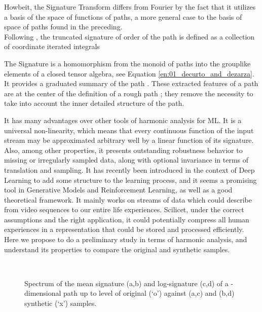\documentclass[lettersize,journal]{IEEEtran}
\begin{document}
Howbeit, the Signature Transform differs from Fourier by the fact that it utilizes a basis of the space of functions of paths, a more general case to the basis of space of paths found in the preceding. 
\\

Following \cite{Bonnier2019}, the truncated signature of order  of the path  is defined as a collection of coordinate iterated integrals


The Signature is a homomorphism from the monoid of paths into the grouplike elements of a closed tensor algebra, see Equation \ref{en:01_decurto_and_dezarza}. It provides a graduated summary of the path . These extracted features of a path are at the center of the definition of a rough path \cite{Lyons2014}; they remove the necessity to take into account the inner detailed structure of the path.



It has many advantages over other tools of harmonic analysis for ML. It is a universal non-linearity, which means that every continuous function of the input stream may be approximated arbitrary well by a linear function of its signature. Also, among other properties, it presents outstanding robustness behavior to missing or irregularly sampled data, along with optional invariance in terms of translation and sampling. It has recently been introduced in the context of Deep Learning to add some structure to the learning process, and it seems a promising tool in Generative Models and Reinforcement Learning, as well as a good theoretical framework. It mainly works on streams of data which could describe from video sequences to our entire life experiences. Scilicet, under the correct assumptions and the right application, it could potentially compress all human experiences in a representation that could be stored and processed efficiently. Here we propose to do a preliminary study in terms of harmonic analysis, and understand its properties to compare the original and synthetic samples.

\begin{figure}[ht]
\centering
{}
\\
\caption{Spectrum of the mean signature (a,b) and log-signature (c,d) of a -dimensional path up to level  of original (`o') against  (a,c) and  (b,d) synthetic (`x') samples.}
\label{fge:07_decurto_and_dezarza}
\end{figure}
\end{document}

